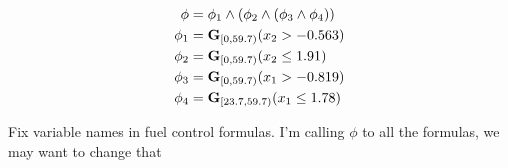 \begin{equation}
    \label{eq:fuel1}
\begin{aligned}
    \phi & = \phi_1 \wedge (\phi_2 \wedge (\phi_3 \wedge \phi_4)) \\
    \phi_1 & = \mathbf{G}_{[0,59.7)} (x_{2}>-0.563) \\
    \phi_2 & = \mathbf{G}_{[0,59.7)} (x_{2}\le1.91) \\
    \phi_3 & = \mathbf{G}_{[0,59.7)} (x_{1}>-0.819) \\
    \phi_4 & = \mathbf{G}_{[23.7,59.7)} (x_{1}\le1.78)
\end{aligned}
\end{equation}

{\color{blue} Fix variable names in fuel control formulas. I'm calling $\phi$ to all the formulas, we may want to change that}
